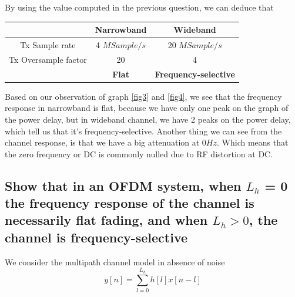 \documentclass[frenchb, oneside, headings=normal]{scrartcl}
\begin{document}
By using the value computed in the previous question, we can deduce that

\begin{center}
	\begin{tabular}{c|c|c}
		  & Narrowband & Wideband\\
		  \hline
	Tx Sample rate & 4 $MSample/s$ & 20 $MSample/s$ \\	  
	Tx Oversample factor & 20 & 4\\
	\hline
     & \color{red} \textbf{Flat}  & \color{red} \textbf{Frequency-selective}\\                               
	\end{tabular}
	\label{tab1}
\end{center}
Based on our observation of graph \ref{fig3} and \ref{fig4}, we see that the frequency response in narrowband is flat, because we have only one peak on the graph of the power delay, but in wideband channel, we have 2 peaks on the power delay, which tell us that it's frequency-selective.
Another thing we can see from the channel response, is that we have a big attenuation at $0 Hz$. Which means that the zero frequency or DC is commonly nulled due to RF distortion at DC. 

\subsection{Show that in an OFDM system, when $L_h$ = 0 the frequency response of the channel is necessarily flat fading, and when $L_h > 0$, the channel is frequency-selective}

We consider the multipath channel model in absence of noise 
\begin{equation}
y[n]=\sum_{l=0}^{L_h} h[l]x[n-l] 
\end{equation}
\end{document}
